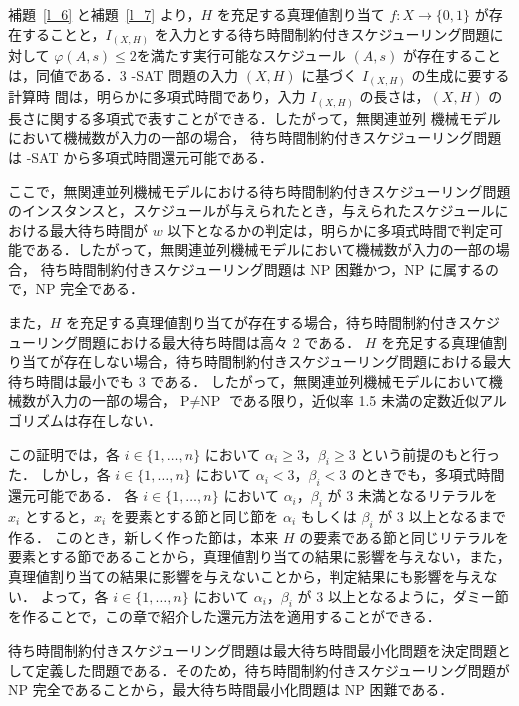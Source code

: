 \documentclass[12pt]{optlab-bachelor}
\begin{document}
補題~\ref{l_6} と補題~\ref{l_7} より，$H$ を充足する真理値割り当て $f : X \to \{0, 1\}$ が存在することと，$I_{(X,H)}$ を入力とする待ち時間制約付きスケジューリング問題に対して $\varphi(A,s) \le 2$を満たす実行可能なスケジュール $(A,s)$ が存在することは，同値である．3 -SAT 問題の入力 $(X,H)$ に基づく $I_{(X,H)}$ の生成に要する計算時
間は，明らかに多項式時間であり，入力 $I_{(X,H)}$ の長さは，$(X, H)$
の長さに関する多項式で表すことができる．したがって，無関連並列
機械モデルにおいて機械数が入力の一部の場合， 待ち時間制約付きスケジューリング問題は
{-SAT} から多項式時間還元可能である．

ここで，無関連並列機械モデルにおける待ち時間制約付きスケジューリング問題のインスタンスと，スケジュールが与えられたとき，与えられたスケジュールにおける最大待ち時間が $w$ 以下となるかの判定は，明らかに多項式時間で判定可能である．したがって，無関連並列機械モデルにおいて機械数が入力の一部の場合， 待ち時間制約付きスケジューリング問題は NP 困難かつ，NP に属するので，NP 完全である．

また，$H$ を充足する真理値割り当てが存在する場合，待ち時間制約付きスケジューリング問題における最大待ち時間は高々 2 である．
$H$ を充足する真理値割り当てが存在しない場合，待ち時間制約付きスケジューリング問題における最大待ち時間は最小でも 3 である．
したがって，無関連並列機械モデルにおいて機械数が入力の一部の場合，$\text{P} \neq \text{NP}$ である限り，近似率 1.5 未満の定数近似アルゴリズムは存在しない．

この証明では，各 $i \in \{1,\ldots,n\}$ において $\alpha_i \ge 3$，$\beta_i \ge 3$ という前提のもと行った．
しかし，各 $i \in \{1,\ldots,n\}$ において $\alpha_i < 3$，$\beta_i < 3$ のときでも，多項式時間還元可能である．
各 $i \in \{1,\ldots,n\}$ において $\alpha_i$，$\beta_i$ が 3 未満となるリテラルを $x_i$ とすると，$x_i$ を要素とする節と同じ節を $\alpha_i$ もしくは $\beta_i$ が 3 以上となるまで作る．
このとき，新しく作った節は，本来 $H$ の要素である節と同じリテラルを要素とする節であることから，真理値割り当ての結果に影響を与えない，また，真理値割り当ての結果に影響を与えないことから，判定結果にも影響を与えない．
よって，各 $i \in \{1,\ldots,n\}$ において $\alpha_i$，$\beta_i$ が 3 以上となるように，ダミー節を作ることで，この章で紹介した還元方法を適用することができる．

待ち時間制約付きスケジューリング問題は最大待ち時間最小化問題を決定問題として定義した問題である．そのため，待ち時間制約付きスケジューリング問題が NP 完全であることから，最大待ち時間最小化問題は NP 困難である．
\end{document}
